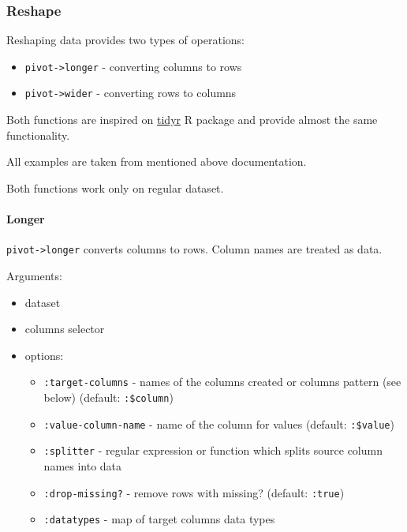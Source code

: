 \documentclass[]{article}
\providecommand{\tightlist}{%
  \setlength{\itemsep}{0pt}\setlength{\parskip}{0pt}}
\let\oldparagraph\paragraph
\renewcommand{\paragraph}[1]{\oldparagraph{#1}\mbox{}}
\begin{document}
\subsubsection{Reshape}\label{reshape}

Reshaping data provides two types of operations:

\begin{itemize}
\tightlist
\item
  \texttt{pivot-\textgreater{}longer} - converting columns to rows
\item
  \texttt{pivot-\textgreater{}wider} - converting rows to columns
\end{itemize}

Both functions are inspired on
\href{https://tidyr.tidyverse.org/articles/pivot.html}{tidyr} R package
and provide almost the same functionality.

All examples are taken from mentioned above documentation.

Both functions work only on regular dataset.

\paragraph{Longer}\label{longer}

\texttt{pivot-\textgreater{}longer} converts columns to rows. Column
names are treated as data.

Arguments:

\begin{itemize}
\tightlist
\item
  dataset
\item
  columns selector
\item
  options:

  \begin{itemize}
  \tightlist
  \item
    \texttt{:target-columns} - names of the columns created or columns
    pattern (see below) (default: \texttt{:\$column})
  \item
    \texttt{:value-column-name} - name of the column for values
    (default: \texttt{:\$value})
  \item
    \texttt{:splitter} - regular expression or function which splits
    source column names into data
  \item
    \texttt{:drop-missing?} - remove rows with missing? (default:
    \texttt{:true})
  \item
    \texttt{:datatypes} - map of target columns data types
  \end{itemize}
\end{itemize}
\end{document}
